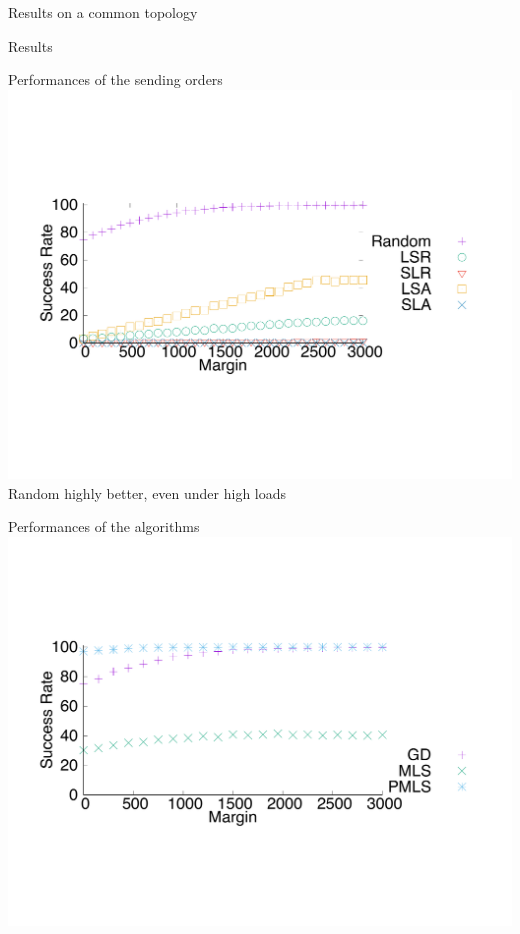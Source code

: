 \documentclass[10 pt]{beamer}
\begin{document}
\begin{section}{Results on a common topology}
\begin{subsection}{Results}
\begin{frame}{Performances of the sending orders}
\centering
  \includegraphics[scale=0.5]{departs_gp_21000.pdf}\\
  
  Random highly better, even under high loads
  \end{frame}
  \begin{frame}{Performances of the algorithms}
\centering
  \includegraphics[scale=0.5]{retour_21000.pdf}\\
  \end{frame}
  

\end{subsection}
\end{section}
\end{document}
